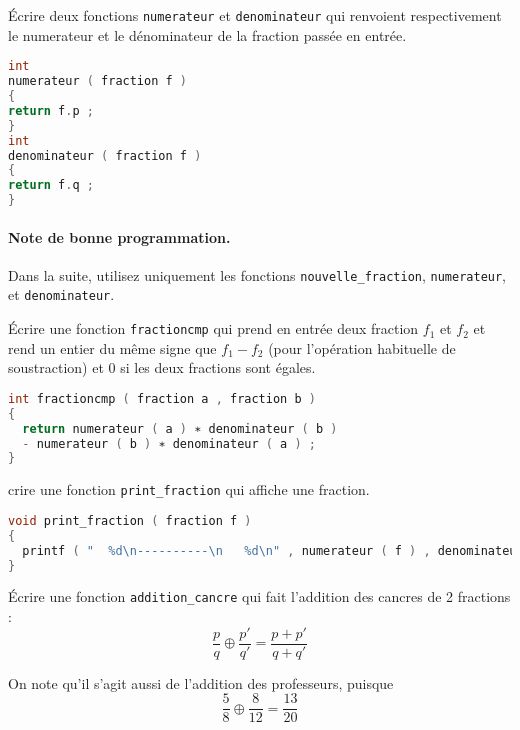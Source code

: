 \question Écrire deux fonctions \texttt{numerateur} et
\texttt{denominateur} qui renvoient respectivement le numerateur et le
dénominateur de la fraction passée en entrée.

\begin{solutioncachee}
  \begin{lstlisting}[language=C]
int
numerateur ( fraction f )
{
return f.p ;
}
int
denominateur ( fraction f )
{
return f.q ;
}
\end{lstlisting}
\end{solutioncachee}

\paragraph{Note de bonne programmation.} Dans la suite, utilisez
uniquement les fonctions \texttt{nouvelle\_fraction}, \texttt{numerateur}, et
\texttt{denominateur}.


\question Écrire une fonction \texttt{fractioncmp} qui prend en entrée
deux fraction \(f_1\) et \(f_2\) et rend un entier du même signe que
\(f_1 - f_2\) (pour l’opération habituelle de soustraction) et \(0\)
si les deux fractions sont égales.

\begin{solutioncachee}
  \begin{lstlisting}[language=C]
int fractioncmp ( fraction a , fraction b )
{
  return numerateur ( a ) ∗ denominateur ( b ) 
  - numerateur ( b ) ∗ denominateur ( a ) ;
}
\end{lstlisting}
\end{solutioncachee}


crire une fonction \texttt{print\_fraction} qui affiche une
fraction.
\begin{solutioncachee}
  \begin{lstlisting}[language=C]
void print_fraction ( fraction f )
{
  printf ( "  %d\n----------\n   %d\n" , numerateur ( f ) , denominateur ( f ) ) ;
}
\end{lstlisting}
\end{solutioncachee}


\question Écrire une fonction \texttt{addition\_cancre} qui fait
l’addition des cancres de 2 fractions :
\[
  \frac pq \oplus \frac{p'}{q'} = \frac{p+p'}{q+q'}
\]

On note qu’il s’agit aussi de l’addition des professeurs, puisque
\[
  \frac 58 \oplus \frac{8}{12} = \frac{13}{20}
\]

